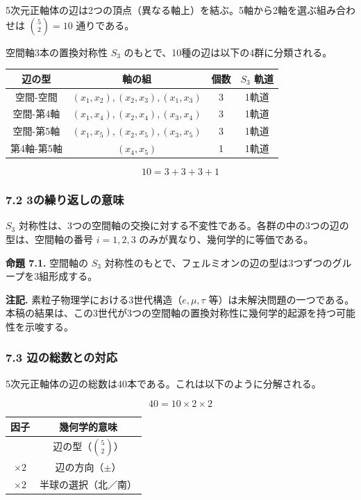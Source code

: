\documentclass[a4paper,11pt]{ltjsarticle}
\newcounter{none}
\begin{document}
5次元正軸体の辺は2つの頂点（異なる軸上）を結ぶ。5軸から2軸を選ぶ組み合わせは
$\binom{5}{2} = 10$ 通りである。

空間軸3本の置換対称性 $S_3$
のもとで、10種の辺は以下の4群に分類される。

{\def\LTcaptype{none}
\begin{longtable}[]{@{}cccc@{}}
\toprule
辺の型 & 軸の組 & 個数 & $S_3$ 軌道 \\
\midrule
\endhead
\bottomrule
\endlastfoot
空間-空間 & $(x_1, x_2), (x_2, x_3), (x_1, x_3)$ & 3 & 1軌道 \\
空間-第4軸 & $(x_1, x_4), (x_2, x_4), (x_3, x_4)$ & 3 & 1軌道 \\
空間-第5軸 & $(x_1, x_5), (x_2, x_5), (x_3, x_5)$ & 3 & 1軌道 \\
第4軸-第5軸 & $(x_4, x_5)$ & 1 & 1軌道 \\
\end{longtable}
}

\[10 = 3 + 3 + 3 + 1\]

\subsubsection*{7.2 3の繰り返しの意味}

$S_3$
対称性は、3つの空間軸の交換に対する不変性である。各群の中の3つの辺の型は、空間軸の番号
$i = 1, 2, 3$ のみが異なり、幾何学的に等価である。

\textbf{命題 7.1.} 空間軸の $S_3$
対称性のもとで、フェルミオンの辺の型は3つずつのグループを3組形成する。

\textbf{注記.} 素粒子物理学における3世代構造（$e, \mu, \tau$
等）は未解決問題の一つである。本稿の結果は、この3世代が3つの空間軸の置換対称性に幾何学的起源を持つ可能性を示唆する。

\subsubsection*{7.3 辺の総数との対応}

5次元正軸体の辺の総数は40本である。これは以下のように分解される。

\[40 = 10 \times 2 \times 2\]

{\def\LTcaptype{none}
\begin{longtable}[]{@{}cc@{}}
\toprule
因子 & 幾何学的意味 \\
\midrule
\endhead
\bottomrule
\endlastfoot
10 & 辺の型（$\binom{5}{2}$） \\
$\times 2$ & 辺の方向（$\pm$） \\
$\times 2$ & 半球の選択（北／南） \\
\end{longtable}
}
\end{document}
